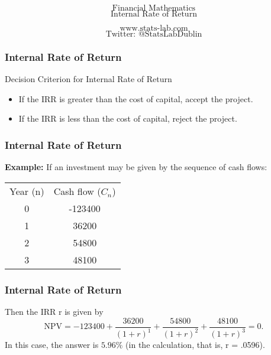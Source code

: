 \documentclass{beamer}
\begin{document}
\begin{frame}
\Huge
\[\mbox{Financial Mathematics}\]
\LARGE
\[\mbox{Internal Rate of Return}\]

\Large
\[\mbox{www.stats-lab.com}\]
\[\mbox{Twitter: @StatsLabDublin}\]

\end{frame}


\begin{frame}
\frametitle{Internal Rate of Return}
\Large
Decision Criterion for Internal Rate of Return
\begin{itemize}
\item If the IRR is greater than the cost of capital, accept the project.
\item If the IRR is less than the cost of capital, reject the project.
\end{itemize}

\end{frame}
\begin{frame}
\frametitle{Internal Rate of Return}
\Large
\textbf{Example:} If an investment may be given by the sequence of cash flows:

\begin{tabular}{|c|c|}
Year (n) &	Cash flow ($C_n$)\\
0 &	-123400 \\
1 &	36200\\
2 &	54800\\
3 &	48100\\
\end{tabular} 

\end{frame}
\begin{frame}
\frametitle{Internal Rate of Return}
Then the IRR r is given by
\[\mathrm{NPV} = -123400+\frac{36200}{(1+r)^1} + \frac{54800}{(1+r)^2} + \frac{48100}{(1+r)^3} = 0.\]
In this case, the answer is $5.96\%$ (in the calculation, that is, r = .0596).
\end{frame}

\end{document}
